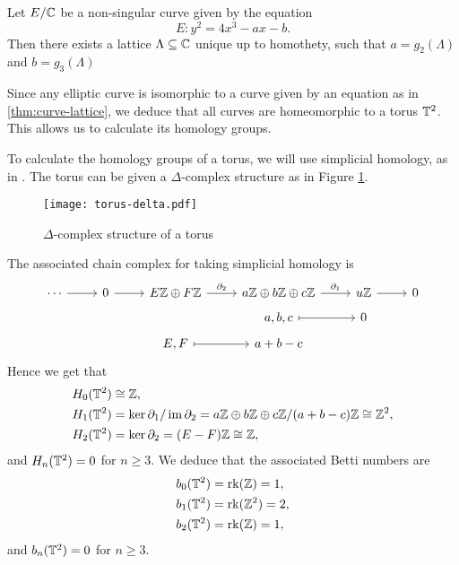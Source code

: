 \begin{theorem}
	\label{thm:curve-lattice}
	Let $E/\mathbb{C}$ be a non-singular curve given by the equation
	\begin{equation*}
		E: y^2 = 4x^3 - ax - b.
	\end{equation*} 
	Then there exists a lattice
	$\Lambda \subseteq \mathbb{C}$ unique up to homothety, such that
	$a = g_2(\Lambda)$ and $b = g_3(\Lambda)$
\end{theorem}

Since any elliptic curve is isomorphic to a curve given by an equation as in
\ref{thm:curve-lattice}, we deduce that all curves are homeomorphic
to a torus $\mathbb{T}^2$. This allows us to calculate its homology groups.

To calculate the homology groups of a torus, we will use simplicial homology,
as in \cite[\S2.1]{hatcher}. The torus can be given a $\Delta$-complex structure
as in Figure \ref{fig:torus-delta}.
\begin{figure}[h]
	\centering 
	\texttt{[image: torus-delta.pdf]}
	\caption[torus-delta]{$\Delta$-complex structure of a torus}
	\label{fig:torus-delta}
\end{figure}

The associated chain complex for taking simplicial homology is 
\begin{equation*}
	\begin{tikzcd}[row sep=tiny]
	\cdots & 0 & {E\Z \oplus F\Z} & {a\Z\oplus b\Z\oplus c\Z} & u\Z & 0 \\
	&&& {a,b,c} & 0 \\
	&& {E,F} & {a +b-c}
	\arrow["\partial_1", from=1-4, to=1-5]
	\arrow["\partial_2", from=1-3, to=1-4]
	\arrow[from=1-5, to=1-6]
	\arrow[from=1-2, to=1-3]
	\arrow[from=1-1, to=1-2]
	\arrow[maps to, from=3-3, to=3-4]
	\arrow[maps to, from=2-4, to=2-5]
\end{tikzcd}
\end{equation*}
Hence we get that
\begin{align*}
	H_0(\mathbb{T}^2) &\cong \mathbb{Z},\\
	H_1(\mathbb{T}^2) &= \ker \partial_1 / \operatorname{im} \partial_2
	= a\mathbb{Z} \oplus b\mathbb{Z} \oplus c\mathbb{Z} / (a + b - c)\mathbb{Z} \cong \mathbb{Z}^2,\\
	H_2(\mathbb{T}^2) &= \ker \partial_2 = (E-F)\mathbb{Z} \cong \mathbb{Z},
\end{align*}
and $H_n(\mathbb{T}^2) = 0$ for $n \geq 3$.
We deduce that the associated Betti numbers are
\begin{align*}
	b_0(\mathbb{T}^2) &= \operatorname{rk}(\mathbb{Z}) = 1,\\
	b_1(\mathbb{T}^2) &= \operatorname{rk}(\mathbb{Z}^2) = 2,\\
	b_2(\mathbb{T}^2) &= \operatorname{rk}(\mathbb{Z}) = 1,
\end{align*}
and $b_n(\mathbb{T}^2) = 0$ for $n \geq 3$.
